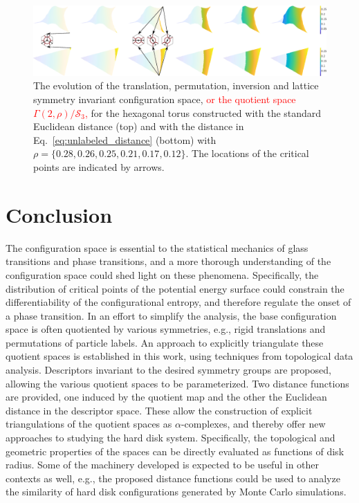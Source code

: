 \documentclass[default,iicol]{sn-jnl}%
\theoremstyle{thmstyleone}%
\theoremstyle{thmstyletwo}%
\theoremstyle{thmstylethree}%
\providecommand{\red}[1]{\textcolor{red}{#1}}
\begin{document}
\begin{figure}
	\centering
	\includegraphics[width=1.0\textwidth]{figure13.eps}
	\caption{The evolution of the translation, permutation, inversion and lattice symmetry invariant configuration space, \red{or the quotient space $\Gamma(2, \rho) / \mathcal{S}_3$,} for the hexagonal torus constructed with the standard Euclidean distance (top) and with the distance in Eq.\ \ref{eq:unlabeled_distance} (bottom) with $\rho=\{0.28, 0.26, 0.25, 0.21, 0.17, 0.12\}$. The locations of the critical points are indicated by arrows.}
	\label{fig:figure13}
\end{figure}	

\section{Conclusion}
\label{sec:conclusion}	

The configuration space is essential to the statistical mechanics of glass transitions and phase transitions, and a more thorough understanding of the configuration space could shed light on these phenomena. Specifically, the distribution of critical points of the potential energy surface could constrain the differentiability of the configurational entropy, and therefore regulate the onset of a phase transition. In an effort to simplify the analysis, the base configuration space is often quotiented by various symmetries, e.g., rigid translations and permutations of particle labels. An approach to explicitly triangulate these quotient spaces is established in this work, using techniques from topological data analysis. Descriptors invariant to the desired symmetry groups are proposed, allowing the various quotient spaces to be parameterized. Two distance functions are provided, one induced by the quotient map and the other the Euclidean distance in the descriptor space. These allow the construction of explicit triangulations of the quotient spaces as $\alpha$-complexes, and thereby offer new approaches to studying the hard disk system. Specifically, the topological and geometric properties of the spaces can be directly evaluated as functions of disk radius. Some of the machinery developed is expected to be useful in other contexts as well, e.g., the proposed distance functions could be used to analyze the similarity of hard disk configurations generated by Monte Carlo simulations.
\end{document}
